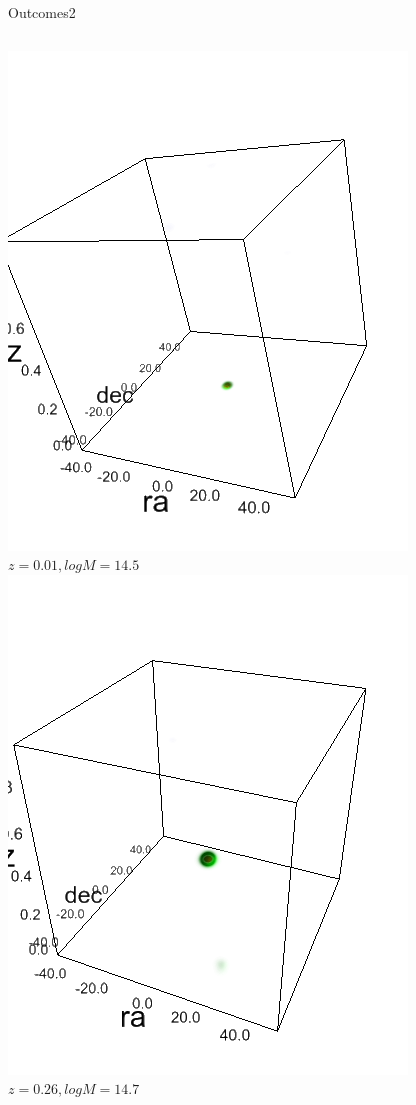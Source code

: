 \documentclass[10pt]{beamer}
\begin{document}
\begin{frame}{Outcomes2}
\begin{columns}
\begin{column}{0.32\textwidth}
\includegraphics[height=.9\textwidth]{./tau20spect-z1-m4.png}
$z=0.01, logM=14.5$
\includegraphics[height=.9\textwidth]{./tau20spect-z3-m5.png}
$z=0.26, logM=14.7$
\end{column}

\end{columns}
\end{frame}
\end{document}
